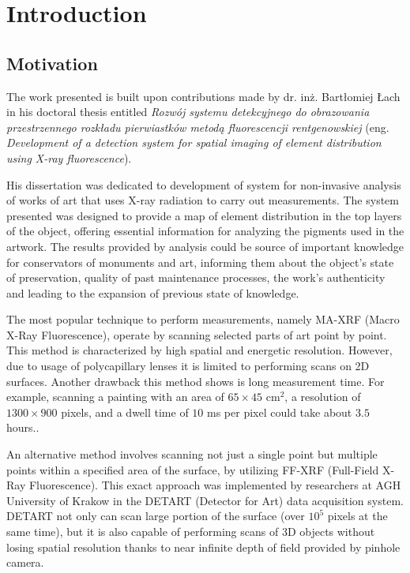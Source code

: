\section{Introduction}
\subsection{Motivation}
The work presented is built upon contributions made by dr. inż. Bartłomiej Łach in his doctoral thesis entitled \emph{Rozwój systemu detekcyjnego do obrazowania przestrzennego rozkładu pierwiastków metodą fluorescencji rentgenowskiej}\cite{Lach2022}  (eng. \emph{Development of a detection system for spatial imaging of element distribution using X-ray fluorescence}).

His dissertation was dedicated to development of system for non-invasive analysis of works of art that uses X-ray radiation to carry out measurements. 
The system presented was designed to provide a map of element distribution in the top layers of the object, offering essential information for analyzing the pigments used in the artwork. 
The results provided by analysis could be source of important knowledge for conservators of monuments and art, informing them about the object's state of preservation, quality of past maintenance processes, the work's authenticity and leading to the expansion of previous state of knowledge.

The most popular technique to perform measurements, namely MA-XRF (Macro X-Ray Fluorescence), operate by scanning selected parts of art point by point. 
This method is characterized by high spatial and energetic resolution. 
However, due to usage of polycapillary lenses it is limited to performing scans on 2D surfaces.
Another drawback this method shows is long measurement time. 
For example, scanning a painting with an area of $65 \times 45$ $\text{cm}^{2}$, a resolution of $1300 \times 900$ pixels, and a  dwell time of $10$ ms per pixel could take about $3.5$ hours.\cite{Alfeld2013}. 

An alternative method involves scanning not just a single point but multiple points within a specified area of the surface, by utilizing FF-XRF (Full-Field X-Ray Fluorescence). 
This exact approach was implemented by researchers at AGH University of Krakow in the DETART (Detector for Art) data acquisition system. 
DETART not only can scan large portion of the surface (over $10^5$ pixels at the same time), but it is also capable of performing scans of 3D objects without losing spatial resolution thanks to near infinite depth of field provided by pinhole camera. 


